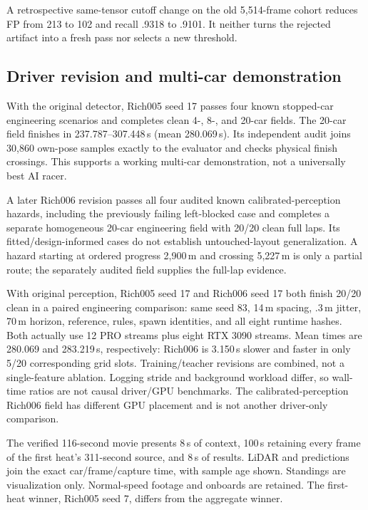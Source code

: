 \documentclass[conference]{IEEEtran}
\begin{document}
A retrospective same-tensor cutoff change on the old 5,514-frame cohort reduces FP from 213 to 102 and recall .9318 to .9101. It neither turns the rejected artifact into a fresh pass nor selects a new threshold.

\subsection{Driver revision and multi-car demonstration}
With the original detector, Rich005 seed 17 passes four known stopped-car engineering scenarios and completes clean 4-, 8-, and 20-car fields. The 20-car field finishes in 237.787--307.448\,s (mean 280.069\,s). Its independent audit joins 30,860 own-pose samples exactly to the evaluator and checks physical finish crossings. This supports a working multi-car demonstration, not a universally best AI racer.

A later Rich006 revision passes all four audited known calibrated-perception hazards, including the previously failing left-blocked case and completes a separate homogeneous 20-car engineering field with 20/20 clean full laps. Its fitted/design-informed cases do not establish untouched-layout generalization. A hazard starting at ordered progress 2,900\,m and crossing 5,227\,m is only a partial route; the separately audited field supplies the full-lap evidence.

With original perception, Rich005 seed 17 and Rich006 seed 17 both finish 20/20 clean in a paired engineering comparison: same seed 83, 14\,m spacing, .3\,m jitter, 70\,m horizon, reference, rules, spawn identities, and all eight runtime hashes. Both actually use 12 PRO streams plus eight RTX 3090 streams. Mean times are 280.069 and 283.219\,s, respectively: Rich006 is 3.150\,s slower and faster in only 5/20 corresponding grid slots. Training/teacher revisions are combined, not a single-feature ablation. Logging stride and background workload differ, so wall-time ratios are not causal driver/GPU benchmarks. The calibrated-perception Rich006 field has different GPU placement and is not another driver-only comparison.

The verified 116-second movie presents 8\,s of context, 100\,s retaining every frame of the first heat's 311-second source, and 8\,s of results. LiDAR and predictions join the exact car/frame/capture time, with sample age shown. Standings are visualization only. Normal-speed footage and onboards are retained. The first-heat winner, Rich005 seed 7, differs from the aggregate winner.
\end{document}
